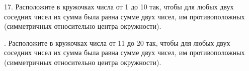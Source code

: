 17. Расположите в кружочках числа от 1 до 10 так, чтобы для любых двух соседних чисел их сумма была равна сумме двух чисел, им противоположных (симметричных относительно центра окружности).
\begin{center}
\begin{figure}[ht!]
\end{figure}
\end{center}
\newpage
{}. Расположите в кружочках числа от 11 до 20 так, чтобы для любых двух соседних чисел их сумма была равна сумме двух чисел, им противоположных (симметричных относительно центра окружности).
\begin{center}
\begin{figure}[ht!]
\end{figure}
\end{center}
